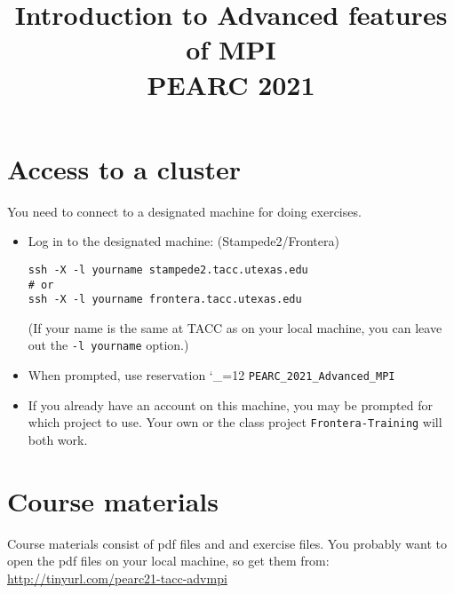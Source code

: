 \documentclass[11pt]{artikel3}
\begin{document}
\title{Introduction to Advanced features of MPI\\ PEARC 2021}
\author{}\date{}
\maketitle

\section{Access to a cluster}

You need to connect to a designated machine for doing exercises.

\begin{itemize}
\item Log in to the designated machine: (Stampede2/Frontera)
\begin{verbatim}
ssh -X -l yourname stampede2.tacc.utexas.edu
# or
ssh -X -l yourname frontera.tacc.utexas.edu
\end{verbatim}
(If your name is the same at TACC as on your local machine,
you can leave out the \texttt{-l yourname} option.)
\item When prompted, use reservation
  {\catcode`\_=12
    \texttt{PEARC_2021_Advanced_MPI}
  }
\item If you already have an account on this machine,
  you may be prompted for which project to use.
  Your own or the class project
  \texttt{Frontera-Training}
  will both work.
\end{itemize}

\section{Course materials}

Course materials consist of pdf files and
and exercise files.
You probably want to open the pdf files
on your local machine, so get them from:\\
\url{http://tinyurl.com/pearc21-tacc-advmpi}
\end{document}
